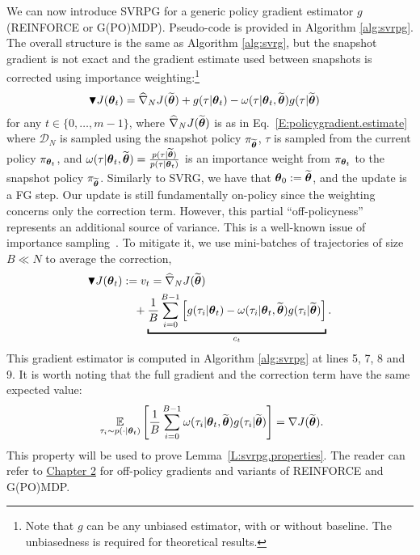 We can now introduce \acs{SVRPG} for a generic policy gradient estimator $g$ (\eg REINFORCE or G(PO)MDP). Pseudo-code is provided in Algorithm \ref{alg:svrpg}.
The overall structure is the same as Algorithm \ref{alg:svrg}, 
but the snapshot gradient is not exact and the gradient estimate used between snapshots is corrected using importance weighting:\footnote{Note that $g$ can be any unbiased estimator, with or without baseline. The unbiasedness is required for theoretical results.}
\begin{align*}
\blacktriangledown J(\vtheta_{t}) &= \wh{\nabla}_N J(\wt{\vtheta}) + g(\tau|\vtheta_t) - \omega(\tau|\vtheta_t, \wt{\vtheta}) g(\tau|\wt{\vtheta})
\end{align*}
for any $t \in \{0,\ldots,m-1\}$,
where $\wh{\nabla}_N J(\wt{\vtheta})$ is as in Eq.~\eqref{E:policygradient.estimate} where $\mathcal{D}_N$ is sampled using the snapshot policy $\pi_{\wt{\vtheta}}$, $\tau$ is sampled from the current policy $\pi_{\vtheta_t}$, and $\omega(\tau|\vtheta_t, \wt{\vtheta}) = \frac{p(\tau|\wt{\vtheta})}{p(\tau|\vtheta_t)}$ is an importance weight from $\pi_{\vtheta_t}$ to the snapshot policy $\pi_{\wt{\vtheta}}$. 
Similarly to \acs{SVRG}, we have that $\vtheta_0 := \wt{\vtheta}$, and the update is a \acs{FG} step.
Our update is still fundamentally on-policy since the weighting concerns only the correction term. However, this partial ``off-policyness'' represents an additional source of variance. This is a well-known issue of importance sampling~\citep[\eg][]{thomas2015high}. To mitigate it, we use mini-batches of trajectories of size $B \ll N$ to average the correction, \ie
\begin{align}\label{E:svrpg.estimate.batch}
\blacktriangledown J(\vtheta_{t}) &:= v_t= \wh{\nabla}_N J(\wt{\vtheta})\\ \notag
& \quad{} + 
\underbracket{
	\frac{1}{B} \sum_{i=0}^{B-1} \left[
	g(\tau_i|\vtheta_t) - \omega(\tau_i|\vtheta_t, \wt{\vtheta}) g(\tau_i|\wt{\vtheta})
	\right]}_{c_t}.
\end{align}
This gradient estimator is computed in Algorithm \ref{alg:svrpg} at lines 5, 7, 8 and 9.\newline
It is worth noting that the full gradient and the correction term have the same expected value:
\[
\ \EVV[\tau_i \sim p(\cdot|\vtheta_t)]{\frac{1}{B} \sum_{i=0}^{B-1} \omega(\tau_i|\vtheta_t, \wt{\vtheta}) g(\tau_i|\wt{\vtheta})} = \nabla J(\wt{\vtheta}).
\]
This property will be used to prove Lemma~\ref{L:svrpg.properties}. The reader can refer to \hyperref[chap:art]{Chapter 2} for off-policy gradients and variants of REINFORCE and G(PO)MDP.

